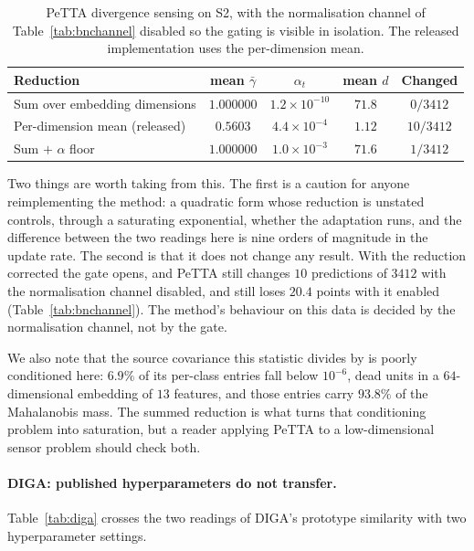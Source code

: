 \documentclass[a4paper,fleqn]{cas-dc}
\begin{document}
\begin{table}[t]
\centering
\caption{PeTTA divergence sensing on S2, with the normalisation channel of
Table~\ref{tab:bnchannel} disabled so the gating is visible in isolation. The released
implementation uses the per-dimension mean.}
\label{tab:petta}
\small
\begin{tabular}{lcccc}
\toprule
Reduction & mean $\bar\gamma$ & $\alpha_t$ & mean $d$ & Changed \\
\midrule
Sum over embedding dimensions & $1.000000$ & $1.2\times10^{-10}$ & $71.8$ & $0/3412$ \\
Per-dimension mean (released) & $0.5603$   & $4.4\times10^{-4}$  & $1.12$ & $10/3412$ \\
Sum $+$ $\alpha$ floor        & $1.000000$ & $1.0\times10^{-3}$  & $71.6$ & $1/3412$ \\
\bottomrule
\end{tabular}
\end{table}

Two things are worth taking from this. The first is a caution for anyone reimplementing the
method: a quadratic form whose reduction is unstated controls, through a saturating
exponential, whether the adaptation runs, and the difference between the two readings here
is nine orders of magnitude in the update rate. The second is that it does not change any
result. With the reduction corrected the gate opens, and PeTTA still changes $10$
predictions of $3412$ with the normalisation channel disabled, and still loses $20.4$ points
with it enabled (Table~\ref{tab:bnchannel}). The method's behaviour on this data is decided
by the normalisation channel, not by the gate.

We also note that the source covariance this statistic divides by is poorly conditioned
here: $6.9\%$ of its per-class entries fall below $10^{-6}$, dead units in a $64$-dimensional
embedding of $13$ features, and those entries carry $93.8\%$ of the Mahalanobis mass. The
summed reduction is what turns that conditioning problem into saturation, but a reader
applying PeTTA to a low-dimensional sensor problem should check both.

\paragraph{DIGA: published hyperparameters do not transfer.} Table~\ref{tab:diga} crosses
the two readings of DIGA's prototype similarity with two hyperparameter settings.
\end{document}
